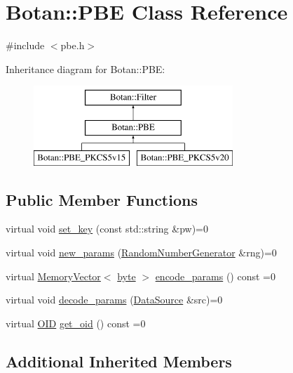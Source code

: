 \hypertarget{classBotan_1_1PBE}{\section{Botan\-:\-:P\-B\-E Class Reference}
\label{classBotan_1_1PBE}
}


{\ttfamily \#include $<$pbe.\-h$>$}

Inheritance diagram for Botan\-:\-:P\-B\-E\-:\begin{figure}[H]
\begin{center}
\leavevmode
\includegraphics[height=3.000000cm]{classBotan_1_1PBE}
\end{center}
\end{figure}
\subsection*{Public Member Functions}
\begin{DoxyCompactItemize}
\item 
virtual void \hyperlink{classBotan_1_1PBE_abe575e1e215dccf4ebeadc9c4600158d}{set\-\_\-key} (const std\-::string \&pw)=0
\item 
virtual void \hyperlink{classBotan_1_1PBE_a21f8bf021ca78ea6a8807c0eef78f034}{new\-\_\-params} (\hyperlink{classBotan_1_1RandomNumberGenerator}{Random\-Number\-Generator} \&rng)=0
\item 
virtual \hyperlink{classBotan_1_1MemoryVector}{Memory\-Vector}$<$ \hyperlink{namespaceBotan_a7d793989d801281df48c6b19616b8b84}{byte} $>$ \hyperlink{classBotan_1_1PBE_a787277e0c23c082edc64a6c0f3599035}{encode\-\_\-params} () const =0
\item 
virtual void \hyperlink{classBotan_1_1PBE_a334f3f1e844704e017c7fa5757e1f6af}{decode\-\_\-params} (\hyperlink{classBotan_1_1DataSource}{Data\-Source} \&src)=0
\item 
virtual \hyperlink{classBotan_1_1OID}{O\-I\-D} \hyperlink{classBotan_1_1PBE_a93f7e1d028e37f1b9bc2f593ad1f4ded}{get\-\_\-oid} () const =0
\end{DoxyCompactItemize}
\subsection*{Additional Inherited Members}


